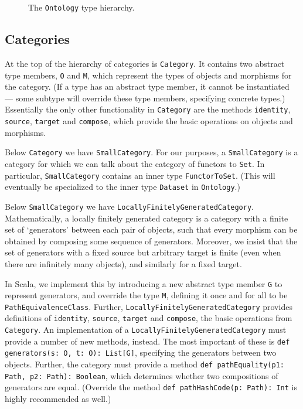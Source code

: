 \documentclass{amsart}
\newcommand{\type}[1]{{\tt #1}}
\newcommand{\code}[1]{{\tt #1}}
\begin{document}
\begin{figure}[ht]
\label{fig:ontology-hierarchy}
\caption{The \type{Ontology} type hierarchy.}
\end{figure}

\subsection{Categories}
At the top of the hierarchy of categories is \type{Category}. It contains two abstract type members, \code{O} and \code{M}, which represent the types of objects and morphisms for the category. (If a type has an abstract type member, it cannot be instantiated --- some subtype will override these type members, specifying concrete types.) Essentially the only other functionality in \type{Category} are the methods \code{identity}, \code{source}, \code{target} and \code{compose}, which provide the basic operations on objects and morphisms.

Below \type{Category} we have \type{SmallCategory}. For our purposes, a \type{SmallCategory} is a category for which we can talk about the category of functors to \type{Set}. In particular, \type{SmallCategory} contains an inner type \type{FunctorToSet}. (This will eventually be specialized to the inner type \type{Dataset} in \type{Ontology}.)

Below \type{SmallCategory} we have \type{LocallyFinitelyGeneratedCategory}. Mathematically, a locally finitely generated category is a category with a finite set of `generators' between each pair of objects, such that every morphism can be obtained by composing some sequence of generators. Moreover, we insist that the set of generators with a fixed source but arbitrary target is finite (even when there are infinitely many objects), and similarly for a fixed target.

In Scala, we implement this by introducing a new abstract type member \code{G} to represent generators, and override the type \code{M}, defining it once and for all to be \code{PathEquivalenceClass}. Further, \type{LocallyFinitelyGeneratedCategory} provides definitions of \code{identity}, \code{source}, \code{target} and \code{compose}, the basic operations from \type{Category}. An implementation of a \type{LocallyFinitelyGeneratedCategory} must provide a number of new methods, instead. The most important of these is \code{def generators(s: O, t: O): List[G]}, specifying the generators between two objects. Further, the category must provide a method \code{def pathEquality(p1: Path, p2: Path): Boolean}, which determines whether two compositions of generators are equal. (Override the method \code{def pathHashCode(p: Path): Int} is highly recommended as well.)
\end{document}
